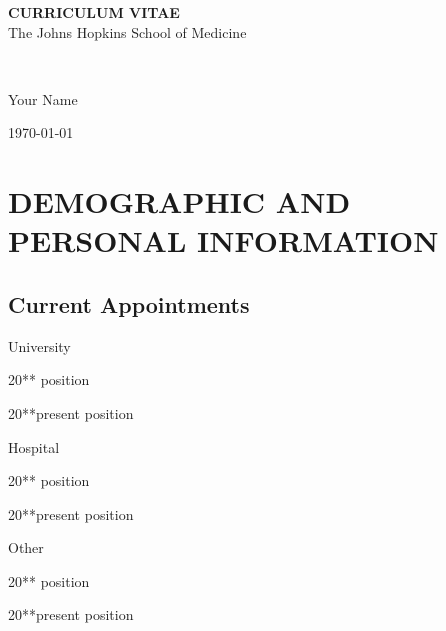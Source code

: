 \documentclass[11pt]{article}
\newenvironment{lyxlist}[1]
	{\begin{list}{}
		{\setlength\itemsep{-0.5ex}
		\settowidth{\labelwidth}{#1}
		 \setlength{\leftmargin}{\labelwidth}
		 \addtolength{\leftmargin}{\labelsep}
		 \renewcommand{\makelabel}[1]{##1\hfil}}}
	{\end{list}}
\newcommand{\mylift}[1]{\vspace*{#1}}
\def\myname{Your Name}
\begin{document}
\begin{center}
{\bf CURRICULUM VITAE}\\
The Johns Hopkins School of Medicine\\
\end{center}

\begin{minipage}[t]{0.3\textwidth}
  \centering{}\\
  \mylift{-1.7ex} %
  \begin{flushleft}\myname\end{flushleft}
\end{minipage}
\begin{minipage}[t]{0.65\textwidth}
  \hfill\today
\end{minipage}

\section*{DEMOGRAPHIC AND PERSONAL INFORMATION}

\subsection*{Current Appointments}

\begin{lyxlist}{0000-present}
\item [{\textcolor{color1}{University}}]
\item [{20{*}{*}\textendash 20{*}{*}}] position
\item [{20{*}{*}\textendash present}] position

\item [{\textcolor{color1}{Hospital}}]
\item [{20{*}{*}\textendash 20{*}{*}}] position
\item [{20{*}{*}\textendash present}] position

\item [{\textcolor{color1}{Other}}]
\item [{20{*}{*}\textendash 20{*}{*}}] position
\item [{20{*}{*}\textendash present}] position

\end{lyxlist}
\end{document}
